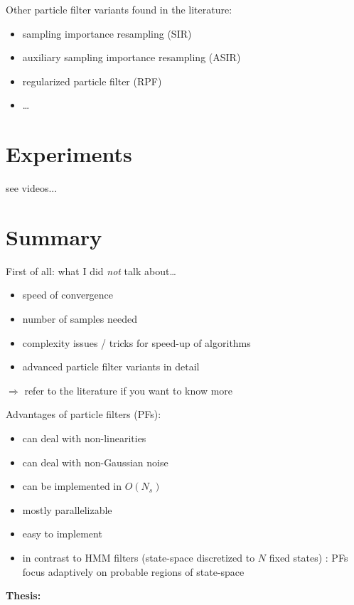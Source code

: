 \documentclass[english,pdftex]{article}
\begin{document}
Other particle filter variants found in the literature:
\begin{itemize}
  \item sampling importance resampling (SIR)
  \item auxiliary sampling importance resampling (ASIR)
  \item regularized particle filter (RPF)
  \item \dots
\end{itemize}




\section{Experiments}

see videos...



\section{Summary}

First of all: what I did \emph{not} talk about\dots
\begin{itemize}
  \item speed of convergence
  \item number of samples needed
  \item complexity issues / tricks for speed-up of algorithms
  \item advanced particle filter variants in detail
\end{itemize}


$\Rightarrow$ refer to the literature if you want to know more



\newpage
Advantages of particle filters (PFs):
\begin{itemize}
  \item can deal with non-linearities
  \item can deal with non-Gaussian noise
  \item can be implemented in $O(N_s)$
  \item mostly parallelizable
  \item easy to implement
  \item in contrast to HMM filters (state-space discretized to $N$ fixed
  states) : PFs focus adaptively on probable regions of state-space
\end{itemize}



\newpage
{\bfseries\Large Thesis:}
\end{document}
